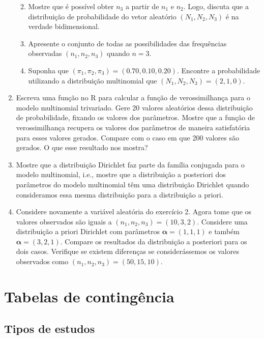 \documentclass[]{book}
\providecommand{\tightlist}{%
  \setlength{\itemsep}{0pt}\setlength{\parskip}{0pt}}
\begin{document}
\begin{enumerate}
  \begin{enumerate}
  \def\labelenumii{\alph{enumii}.}
  \tightlist
  \item
    Mostre que é possível obter \(n_3\) a partir de \(n_1\) e \(n_2\). Logo, discuta que a distribuição de probabilidade do vetor aleatório \((N_1, N_2, N_3)\) é na verdade bidimensional.
  \item
    Apresente o conjunto de todas as possibilidades das frequências observadas \((n_1, n_2, n_3)\) quando \(n = 3\).
  \item
    Suponha que \((\pi_1, \pi_2, \pi_3) = (0.70, 0.10, 0.20)\). Encontre a probabilidade utilizando a distribuição multinomial que \((N_1, N_2, N_3) = (2, 1, 0)\).
  \end{enumerate}
\item
  Escreva uma função no R para calcular a função de verossimilhança para o modelo multinomial trivariado. Gere 20 valores aleatórios dessa distribuição de probabilidade, fixando os valores dos parâmetros. Mostre que a função de verossimilhança recupera os valores dos parâmetros de maneira satisfatória para esses valores gerados. Compare com o caso em que 200 valores são gerados. O que esse resultado nos mostra?
\item
  Mostre que a distribuição Dirichlet faz parte da família conjugada para o modelo multinomial, i.e., mostre que a distribuição a posteriori dos parâmetros do modelo multinomial têm uma distribuição Dirichlet quando consideramos essa mesma distribuição para a distribuição a priori.
\item
  Considere novamente a variável aleatória do exercício 2. Agora tome que os valores observados são iguais a \((n_1, n_2, n_3) = (10, 3, 2)\). Considere uma distribuição a priori Dirichlet com parâmetros \(\boldsymbol \alpha = (1, 1, 1)\) e também \(\boldsymbol \alpha = (3, 2, 1)\). Compare os resultados da distribuição a posteriori para os dois casos. Verifique se existem diferenças se considerássemos os valores observados como \((n_1, n_2, n_3) = (50, 15, 10)\).
\end{enumerate}

\hypertarget{tabelas-de-contingencia}{%
\chapter{Tabelas de contingência}\label{tabelas-de-contingencia}}

\hypertarget{tipos-de-estudos}{%
\section{Tipos de estudos}\label{tipos-de-estudos}}
\end{document}
